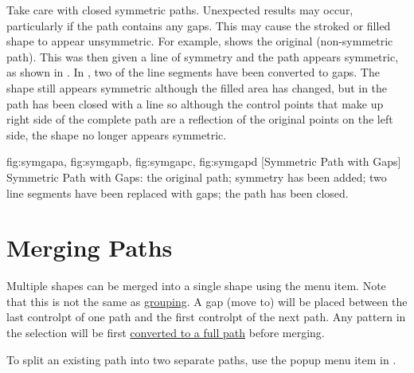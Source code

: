 \begin{warning}
Take care with closed symmetric paths. Unexpected results
may occur, particularly if the path contains any gaps. This may
cause the stroked or filled shape to appear unsymmetric.
For example,  shows the original
(non-symmetric path). This was then given a line of symmetry and
the path appears symmetric, as shown in . In
, two of the line segments have been
converted to gaps. The shape still appears symmetric although the
filled area has changed, but in  the path
has been closed with a line so although the control points that
make up right side of the complete path are a reflection of the
original points on the left side, the shape no longer appears
symmetric.
\end{warning}

{
  {fig:symgapa}{}{},
  {fig:symgapb}{}{},
  {fig:symgapc}{}{},
  {fig:symgapd}{}{}
}
[Symmetric Path with Gaps]
{Symmetric Path with Gaps:
 the original path;
 symmetry has been added;
 two line segments have been replaced with gaps;
 the path has been closed.}


\section{Merging Paths}\label{sec:mergepaths}


Multiple \glspl{shape} can be merged into a single \gls*{shape}
using the  menu item. Note that this is not
the same as \hyperref[sec:grouping]{grouping}.  A \gls{gap} (move
to) will be placed between the last \gls{controlpt} of one path and
the first \gls*{controlpt} of the next path. Any \gls{pattern} in
the selection will be first \hyperref[sec:converttofullpath]{converted
to a full path} before merging.

\begin{information}
To split an existing \gls{path} into two separate \glspl{path}, use the
 popup menu item in \editpathmode.
\end{information}

